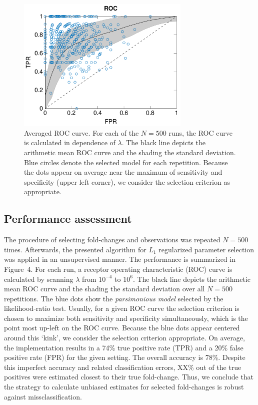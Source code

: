 \documentclass{bioinfo}
\begin{document}
\begin{figure}[!tpb]%
\centerline{\includegraphics[width=235pt]{Figures/ROC.pdf}}
\caption{Averaged ROC curve. For each of the $N = 500$ runs, the ROC curve is calculated in dependence of $\lambda$. The black line depicts the arithmetic mean ROC curve and the shading the standard deviation. Blue circles denote the selected model for each repetition. Because the dots appear on average near the maximum of sensitivity and specificity (upper left corner), we consider the selection criterion as appropriate.}\label{fig:04}
\end{figure}

\subsection{Performance assessment}
The procedure of selecting fold-changes and observations was repeated $N=500$ times. %
Afterwards, the presented algorithm for $L_1$ regularized parameter selection was applied in an unsupervised manner.
The performance is summarized in Figure~4\vphantom{\ref{fig:04}}.
For each run, a receptor operating characteristic (ROC) curve is calculated by scanning $\lambda$ from $10^{-4}$ to $10^6$.
The black line depicts the arithmetic mean ROC curve and the shading the standard deviation over all $N=500$ repetitions.
The blue dots show the \emph{parsimonious model} selected by the likelihood-ratio test.
Usually, for a given ROC curve the selection criterion is chosen to maximize both sensitivity and specificity simultaneously, which is the point most up-left on the ROC curve.
Because the blue dots appear centered around this `kink', we consider the selection criterion appropriate.
On average, the implementation results in a 74\% true positive rate (TPR) and a 20\% false positive rate (FPR) for the given setting.
The overall accuracy is 78\%.
Despite this imperfect accuracy and related classification errors, XX\% out of the true positives were estimated closest to their true fold-change.
Thus, we conclude that the strategy to calculate unbiased estimates for selected fold-changes is robust against missclassification.
\end{document}
